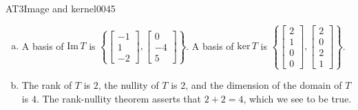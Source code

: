 \begin{exercise}{AT3}{Image and kernel}{0045}
\begin{exerciseAnswer}
\begin{enumerate}[(a)]
 
\item  

 A basis of \(\mathrm{Im}\,T\) is \(\left\{ \left[\begin{array}{c}
-1 \\
1 \\
-2
\end{array}\right] , \left[\begin{array}{c}
0 \\
-4 \\
5
\end{array}\right] \right\}\). A basis of \(\mathrm{ker}\,T\) is \(\left\{ \left[\begin{array}{c}
2 \\
1 \\
0 \\
0
\end{array}\right] , \left[\begin{array}{c}
2 \\
0 \\
2 \\
1
\end{array}\right] \right\}\). 

 
\item  

 The rank of \(T\) is \(2\), the nullity of \(T\) is \(2\), and the dimension of the domain of \(T\) is \(4\). The rank-nullity theorem asserts that \(2+2=4\), which we see to be true. 

 
\end{enumerate}

     \end{exerciseAnswer}
 \end{exercise}



